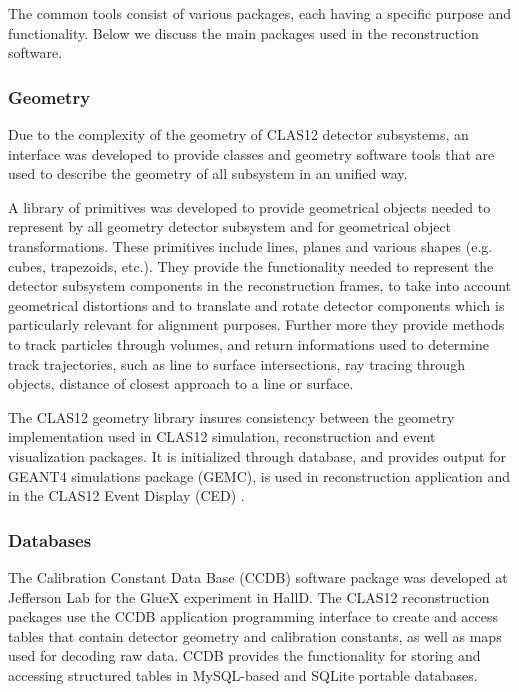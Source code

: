 \documentclass[3p,times,twocolumn]{elsarticle}
\begin{document}
The common tools consist of various packages, each having a specific purpose and functionality. Below we discuss
the main packages used in the reconstruction software.

\subsubsection{Geometry}

Due to the complexity of the geometry of CLAS12 detector subsystems, an interface was developed
to provide classes and geometry software tools that are used to describe the geometry of all subsystem in an unified way.

A library of primitives was developed to provide geometrical objects needed to represent by all geometry detector subsystem
and for geometrical object transformations.  These primitives include lines, planes and various shapes (e.g.
cubes, trapezoids, etc.).  They provide the functionality needed
to represent the detector subsystem components in the reconstruction frames, to take into account geometrical distortions
and to translate and rotate detector components which is particularly relevant for alignment purposes.
Further more they provide methods to track particles through volumes, and return informations used to determine
track trajectories,
such as line to surface intersections, ray tracing through objects, distance of closest approach to a line or surface.

The CLAS12 geometry library insures consistency between the geometry implementation used in CLAS12 simulation, reconstruction and
event visualization packages. It is initialized through database, and provides output for GEANT4 simulations package
(GEMC), is used in reconstruction application and in the CLAS12 Event Display (CED) .

\subsubsection{Databases}

The Calibration Constant Data Base (CCDB) software package was developed at Jefferson Lab for the GlueX experiment
in HallD.  The CLAS12 reconstruction packages use the CCDB application programming interface to create and access
tables that contain detector geometry and calibration constants, as well as maps used for decoding raw data.
CCDB provides the functionality for storing and accessing
structured tables in MySQL-based and SQLite portable databases.
\end{document}
